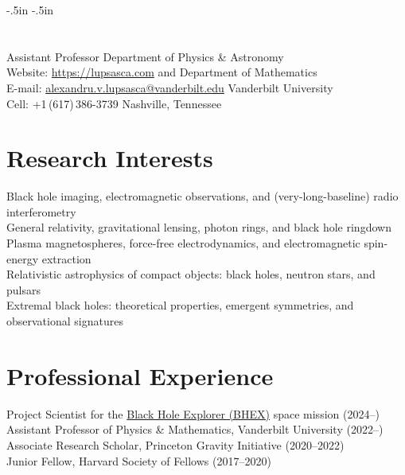 \documentclass[margin,line]{resume}
\begin{document}
\oddsidemargin -.5in
\evensidemargin -.5in
\voffset -25pt
\topmargin 0in
\headsep 25pt
\textwidth=6.0in
\textheight=9.2in
\itemsep=0in
\parsep=0in

\thispagestyle{empty}

\begin{resume}

\section{\mysidestyle}

Assistant Professor
\hfill
Department of Physics \& Astronomy
$\,$ \\
Website: \href{https://lupsasca.com}{https://lupsasca.com}
\hfill
and Department of Mathematics
$\,$ \\
E-mail: \href{mailto:alexandru.v.lupsasca@vanderbilt.edu}{alexandru.v.lupsasca@vanderbilt.edu}
\hfill
Vanderbilt University
$\,$ \\
Cell: +1\,(617)\,386-3739
\hfill
Nashville, Tennessee
$\,$

\section{\mysidestyle Research Interests}

Black hole imaging, electromagnetic observations, and (very-long-baseline) radio interferometry %
\vspace{2mm} \\
%
General relativity, gravitational lensing, photon rings, and black hole ringdown%
\vspace{2mm} \\
%
Plasma magnetospheres, force-free electrodynamics, and electromagnetic spin-energy extraction
\vspace{2mm} \\
%
Relativistic astrophysics of compact objects: black holes, neutron stars, and pulsars
\vspace{2mm} \\
%
Extremal black holes: theoretical properties, emergent symmetries, and observational signatures

\section{\mysidestyle Professional Experience}

Project Scientist for the \href{https://www.blackholeexplorer.org/}{Black Hole Explorer (BHEX)} space mission (2024--)
\vspace{2mm} \\
%
Assistant Professor of Physics \& Mathematics, Vanderbilt University (2022--)
\vspace{2mm} \\
%
Associate Research Scholar, Princeton Gravity Initiative (2020--2022)
\vspace{2mm} \\
%
Junior Fellow, Harvard Society of Fellows (2017--2020)


\end{resume}
\end{document}
